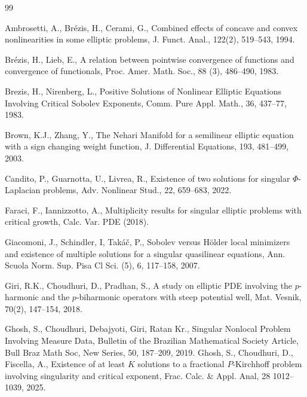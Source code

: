 \documentclass[12pt]{extarticle}
\theoremstyle{definition}
\theoremstyle{remark}
\theoremstyle{definition}
\numberwithin{equation}{section}
\numberwithin{equation}{section}
\begin{document}
	{\small
		\begin{thebibliography}{99}	
			
			
			
			
			 Ambrosetti, A., Br\'{e}zis, H., Cerami, G., Combined effects of concave and convex nonlinearities in some elliptic problems, J. Funct. Anal., 122(2), 519--543, 1994.
			
		
			
			Br\'{e}zis, H., Lieb, E.,
			A relation between pointwise convergence of functions and convergence of functionals,
			Proc. Amer. Math. Soc., 88 (3),  486--490, 1983.
			
			 Brezis, H., Nirenberg, L., Positive Solutions of Nonlinear Elliptic Equations Involving Critical Sobolev Exponents, Comm. Pure Appl. Math., 36, 437--77, 1983.
			
			 Brown, K.J., Zhang, Y., The Nehari Manifold for a semilinear elliptic equation with a sign changing weight function, J. Differential Equations, 193, 481--499, 2003.
			
			
			Candito, P., Guarnotta, U., Livrea, R., Existence of two solutions for singular $\Phi$-Laplacian problems, Adv. Nonlinear Stud., 22, 659--683, 2022.
			
					 Faraci, F.,  Iannizzotto, A., Multiplicity results for singular elliptic problems with critical growth, Calc. Var. PDE (2018).
			
			 Giacomoni, J., Schindler, I, Tak\'{a}\v{c}, P., Sobolev versus H\"{o}lder local minimizers and existence of multiple solutions for a singular quasilinear equations, Ann. Scuola Norm. Sup. Pisa Cl Sci. (5), 6, 117--158, 2007.
			
			
			 Giri, R.K., Choudhuri, D., Pradhan, S., A study on elliptic PDE involving the $p$-harmonic and the $p$-biharmonic operators with steep potential well, Mat. Vesnik, 70(2), 147--154, 2018.

 Ghosh, S., Choudhuri, Debajyoti, Giri, Ratan Kr., Singular Nonlocal Problem Involving Measure Data, Bulletin of the Brazilian Mathematical Society Article, Bull Braz Math Soc, New Series, 50, 187--209, 2019.
 Ghosh, S., Choudhuri, D., Fiscella, A., Existence of at least $K$ solutions to a fractional $P$-Kirchhoff problem involving singularity and critical exponent, Frac. Calc. \& Appl. Anal, 28 1012--1039,  2025.


\end{thebibliography}}
\end{document}
